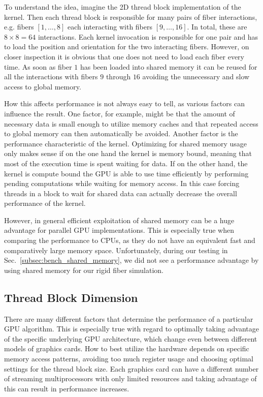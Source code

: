 To understand the idea, imagine the 2D thread block implementation of the kernel. Then each thread block is responsible for many pairs of fiber interactions, e.g. fibers $[1,\dots,8]$ each interacting with fibers $[9,\dots,16]$. In total, these are $8 \times 8 = 64$ interactions. Each kernel invocation is responsible for one pair and has to load the position and orientation for the two interacting fibers. However, on closer inspection it is obvious that one does not need to load each fiber every time. As soon as fiber $1$ has been loaded into shared memory it can be reused for all the interactions with fibers $9$ through $16$ avoiding the unnecessary and slow access to global memory.

How this affects performance is not always easy to tell, as various factors can influence the result. One factor, for example, might be that the amount of necessary data is small enough to utilize memory caches and that repeated access to global memory can then automatically be avoided. Another factor is the performance characteristic of the kernel. Optimizing for shared memory usage only makes sense if on the one hand the kernel is memory bound, meaning that most of the execution time is spent waiting for data. If on the other hand, the kernel is compute bound the GPU is able to use time efficiently by performing pending computations while waiting for memory access. In this case forcing threads in a block to wait for shared data can actually decrease the overall performance of the kernel.

However, in general efficient exploitation of shared memory can be a huge advantage for parallel GPU implementations. This is especially true when comparing the performance to CPUs, as they do not have an equivalent fast and comparatively large memory space. Unfortunately, during our testing in Sec.~\ref{subsec:bench_shared_memory}, we did not see a performance advantage by using shared memory for our rigid fiber simulation.

\subsection{Thread Block Dimension}
\label{subsec:bench_thread_block}

There are many different factors that determine the performance of a particular GPU algorithm. This is especially true with regard to optimally taking advantage of the specific underlying GPU architecture, which change even between different models of graphics cards. How to best utilize the hardware depends on specific memory access patterns, avoiding too much register usage and choosing optimal settings for the thread block size. Each graphics card can have a different number of streaming multiprocessors with only limited resources and taking advantage of this can result in performance increases.

